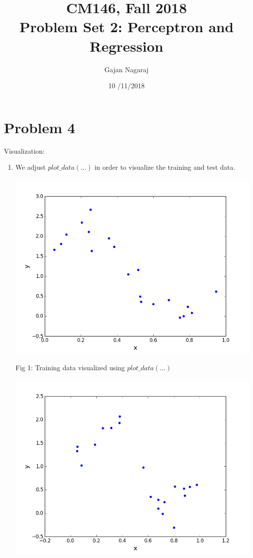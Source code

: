 \documentclass[11pt]{article}
\begin{document}
\title{CM146, Fall 2018 \\ Problem Set 2: Perceptron and Regression}
\author{Gajan Nagaraj}
\date{10	/11/2018}
\maketitle
\vspace{-0.75in}

\section*{Problem 4}
Visualization:

\begin{enumerate}[label=(\alph*)]
\item We adjust $plot\_data(...)$ in order to visualize the training and test data. 
\centerline{\includegraphics[scale=.7]{part_a_train}} 
\centerline{Fig 1: Training data visualized using $plot\_data(...)$}
\centerline{\includegraphics[scale=.7]{part_a_test}} 

\end{enumerate}
\end{document}
